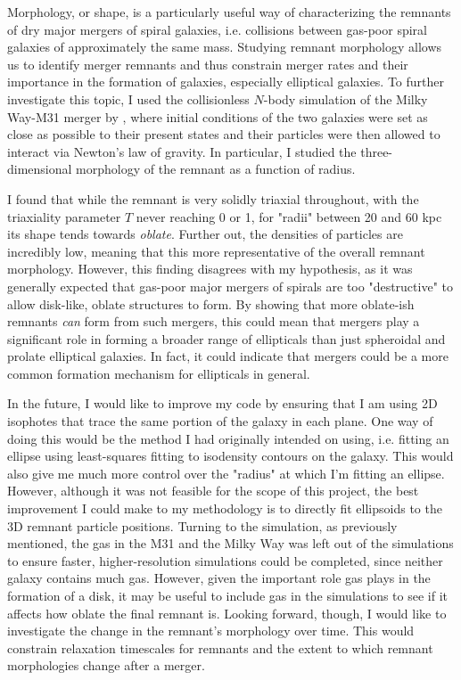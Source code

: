 \documentclass[twocolumn]{aastex631}
\begin{document}
Morphology, or shape, is a particularly useful way of characterizing the remnants of dry major mergers of spiral galaxies, i.e. collisions between gas-poor spiral galaxies of approximately the same mass.
Studying remnant morphology allows us to identify merger remnants and thus constrain merger rates and their importance in the formation of galaxies, especially elliptical galaxies.
To further investigate this topic, I used the collisionless $N$-body simulation of the Milky Way-M31 merger by \cite{van_der_Marel+2012}, where initial conditions of the two galaxies were set as close as possible to their present states and their particles were then allowed to interact via Newton's law of gravity.
In particular, I studied the three-dimensional morphology of the remnant as a function of radius. 

I found that while the remnant is very solidly triaxial throughout, with the triaxiality parameter $T$ never reaching 0 or 1, for "radii" between 20 and 60 kpc its shape tends towards \textit{oblate}.
Further out, the densities of particles are incredibly low, meaning that this more representative of the overall remnant morphology.
However, this finding disagrees with my hypothesis, as it was generally expected that gas-poor major mergers of spirals are too "destructive" to allow disk-like, oblate structures to form.
By showing that more oblate-ish remnants \textit{can} form from such mergers, this could mean that mergers play a significant role in forming a broader range of ellipticals than just spheroidal and prolate elliptical galaxies. 
In fact, it could indicate that mergers could be a more common formation mechanism for ellipticals in general.

In the future, I would like to improve my code by ensuring that I am using 2D isophotes that trace the same portion of the galaxy in each plane. 
One way of doing this would be the method I had originally intended on using, i.e. fitting an ellipse using least-squares fitting to isodensity contours on the galaxy. 
This would also give me much more control over the "radius" at which I'm fitting an ellipse.
However, although it was not feasible for the scope of this project, the best improvement I could make to my methodology is to directly fit ellipsoids to the 3D remnant particle positions.
Turning to the simulation, as previously mentioned, the gas in the M31 and the Milky Way was left out of the simulations to ensure faster, higher-resolution simulations could be completed, since neither galaxy contains much gas.
However, given the important role gas plays in the formation of a disk, it may be useful to include gas in the simulations to see if it affects how oblate the final remnant is.
Looking forward, though, I would like to investigate the change in the remnant's morphology over time.
This would constrain relaxation timescales for remnants and the extent to which remnant morphologies change after a merger.
\end{document}
